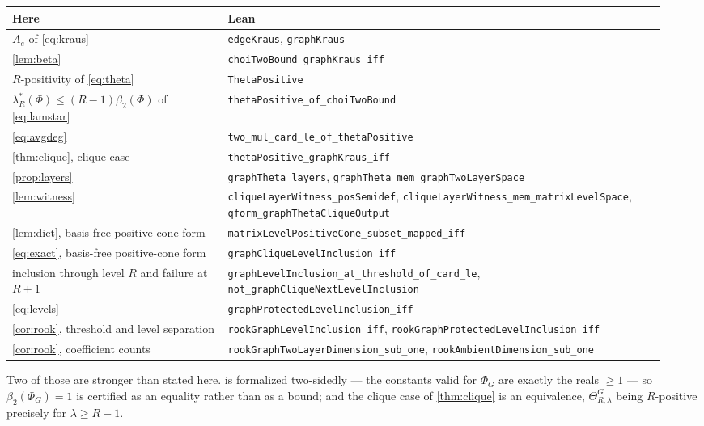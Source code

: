\documentclass[11pt,reqno]{amsart}
\theoremstyle{plain}
\theoremstyle{remark}
\begin{document}
\begin{center}
\begin{tabular}{p{0.31\linewidth}p{0.63\linewidth}}
\hline
Here & Lean\\
\hline
$A_e$ of \cref{eq:kraus} & \texttt{edgeKraus}, \texttt{graphKraus}\\
\cref{lem:beta} & \texttt{choiTwoBound\_graphKraus\_iff}\\
$R$-positivity of \cref{eq:theta} & \texttt{ThetaPositive}\\
$\lambda^*_R(\Phi)\le(R-1)\beta_2(\Phi)$ of \cref{eq:lamstar}
  & \texttt{thetaPositive\_of\_choiTwoBound}\\
\cref{eq:avgdeg} & \texttt{two\_mul\_card\_le\_of\_thetaPositive}\\
\cref{thm:clique}, clique case & \texttt{thetaPositive\_graphKraus\_iff}\\
\cref{prop:layers} & \texttt{graphTheta\_layers},
  \texttt{graphTheta\_mem\_graphTwoLayerSpace}\\
\cref{lem:witness} & \texttt{cliqueLayerWitness\_posSemidef},
  \texttt{cliqueLayerWitness\_mem\_matrixLevelSpace},
  \texttt{qform\_graphThetaCliqueOutput}\\
\cref{lem:dict}, basis-free positive-cone form
  & \texttt{matrixLevelPositiveCone\_subset\_mapped\_iff}\\
\cref{eq:exact}, basis-free positive-cone form
  & \texttt{graphCliqueLevelInclusion\_iff}\\
inclusion through level $R$ and failure at $R+1$
  & \texttt{graphLevelInclusion\_at\_threshold\_of\_card\_le},
    \texttt{not\_graphCliqueNextLevelInclusion}\\
\cref{eq:levels}
  & \texttt{graphProtectedLevelInclusion\_iff}\\
\cref{cor:rook}, threshold and level separation
  & \texttt{rookGraphLevelInclusion\_iff},
    \texttt{rookGraphProtectedLevelInclusion\_iff}\\
\cref{cor:rook}, coefficient counts
  & \texttt{rookGraphTwoLayerDimension\_sub\_one},
    \texttt{rookAmbientDimension\_sub\_one}\\
\hline
\end{tabular}
\end{center}

Two of those are stronger than stated here.   is formalized
two-sidedly --- the constants valid for $\Phi_G$ are exactly the reals $\ge1$ ---
so $\beta_2(\Phi_G)=1$ is certified as an equality rather than as a bound; and
the clique case of \cref{thm:clique} is an equivalence, $\Theta^G_{R,\lambda}$
being $R$-positive precisely for $\lambda\ge R-1$.
\end{document}
